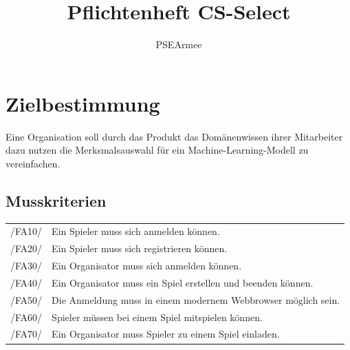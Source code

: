 \documentclass[a4paper]{scrreprt}
\begin{document}
    \title{Pflichtenheft CS-Select}
    \author{PSEArmee}
    \maketitle

    \tableofcontents

    \chapter{Zielbestimmung}
    Eine Organisation soll durch das \Gls{Produkt} das Domänenwissen ihrer Mitarbeiter dazu nutzen die Merksmalsauswahl für ein Machine-Learning-Modell zu vereinfachen.

    \section{Musskriterien}
    \begin{tabular}{ l | l}
        /FA10/ & Ein \Gls{Spieler} muss sich anmelden können. \\
        /FA20/ & Ein \Gls{Spieler} muss sich registrieren können. \\
        /FA30/ & Ein \Gls{Organisator} muss sich anmelden können. \\
        /FA40/ & Ein \Gls{Organisator} muss ein \Gls{Spiel} erstellen und beenden können. \\
        /FA50/ & Die Anmeldung muss in einem modernem \Gls{Webbrowser} möglich sein. \\
        /FA60/ & \Gls{Spieler} müssen bei einem \Gls{Spiel} mitspielen können. \\
        /FA70/ & Ein \Gls{Organisator} muss \Gls{Spieler} zu einem \Gls{Spiel} einladen. \\
    \end{tabular}
\end{document}
